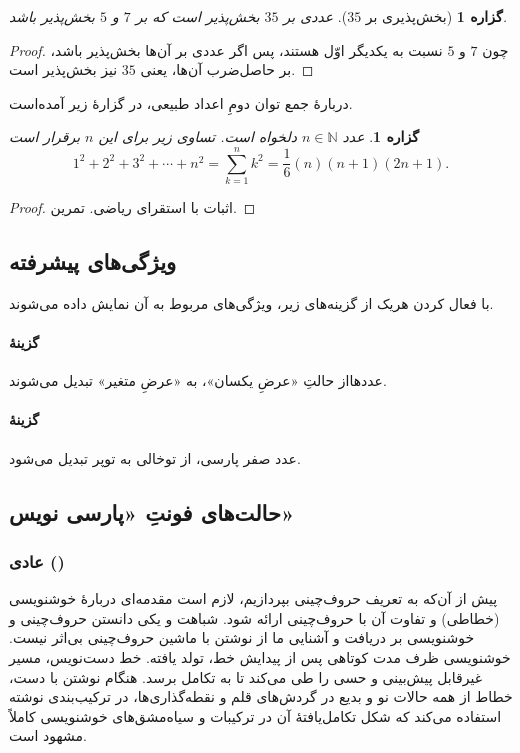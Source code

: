 \documentclass[10pt,a5paper]{article}
\theoremstyle{definition}
\theoremstyle{plain}
\newtheorem{proposition}[definition]{گزاره}
\begin{document}
\begin{proposition}[بخش‌پذیری بر $35$]
عددی بر $35$ بخش‌پذیر است که بر $7$ و $5$ بخش‌پذیر باشد.
\end{proposition}

\begin{proof}
چون $7$ و $5$ نسبت به یکدیگر اوّل هستند، پس اگر عددی بر آن‌ها بخش‌پذیر باشد، بر حاصل‌ضرب آن‌ها، یعنی $35$ نیز بخش‌پذیر است. 
\end{proof}

دربارۀ جمع توان دومِ اعداد طبیعی، در گزارۀ زیر آمده‌است.

\begin{proposition}
عدد $n\in\mathbb{N}$ دلخواه است. تساوی زیر برای این $n$ برقرار است
\[
1^2+2^2+3^2+\cdots+n^2=\sum_{k=1}^n k^2 = \frac{1}{6}(n)(n+1)(2n+1).
\]
\end{proposition}

\begin{proof}
اثبات با استقرای ریاضی. تمرین.
\end{proof}


\subsection{ویژگی‌های پیشرفته}
با فعال کردن هریک از گزینه‌های زیر، ویژگی‌های مربوط به آن نمایش داده می‌شوند.
\paragraph*{گزینۀ }
عددهااز حالتِ «عرضِ یکسان»، به «عرضِ متغیر» تبدیل می‌شوند.
\paragraph*{گزینۀ }
عدد صفر پارسی، از توخالی به توپر تبدیل می‌شود.


\subsection{حالت‌های فونتِ «پارسی نویس»}

\subsubsection{عادی ()}

پیش از آن‌که به تعریف حروف‌چینی بپردازیم، لازم است مقدمه‌ای دربارۀ خوشنویسی (خطاطی) و تفاوت آن با حروف‌چینی ارائه شود. شباهت و یکی دانستن حروف‌چینی و خوشنویسی بر دریافت و آشنایی ما از نوشتن با ماشین حروف‌چینی بی‌اثر نیست. خوشنویسی ظرف مدت کوتاهی پس از پیدایش خط، تولد یافته. خط دست‌نویس، مسیر غیرقابل پیش‌بینی و حسی را طی می‌کند تا به تکامل برسد. هنگام نوشتن با دست، خطاط از همه حالات نو و بدیع در گردش‌های قلم و نقطه‌گذاری‌ها، در ترکیب‌بندی نوشته استفاده می‌کند که شکل تکامل‌یافتۀ آن در ترکیبات و سیاه‌مشق‌های خوشنویسی کاملاً مشهود است.
\end{document}
